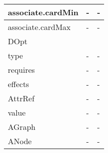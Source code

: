 \begin{table}[]
\begin{tabular}{|l|l|l|}
		associate.cardMin                  & -                                                                                           & -                                                                                      \\ \hline
		associate.cardMax                  & -                                                                                           & -                                                                                      \\ \hline
		DOpt                               &                                                                                             &                                                                                        \\ \hline
		type                               & -                                                                                           & -                                                                                      \\ \hline
		requires                           & -                                                                                           & -                                                                                      \\ \hline
		effects                            & -                                                                                           & -                                                                                      \\ \hline
		AttrRef                            & -                                                                                           & -                                                                                      \\ \hline
		value                              & -                                                                                           & -                                                                                      \\ \hline
		AGraph                             & -                                                                                           & -                                                                                      \\ \hline
		ANode                              & -                                                                                           & -                                                                                      \\ \hline

\end{tabular}
\end{table}
